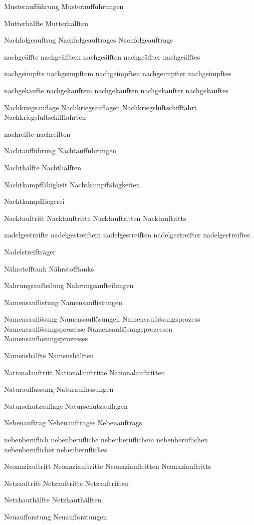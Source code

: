 Musteraufführung
Musteraufführungen

Mutterhälfte
Mutterhälften

Nachfolgeauftrag
Nachfolgeauftrages
Nachfolgeauftrags

nachgeäffte
nachgeäfftem
nachgeäfften
nachgeäffter
nachgeäfftes

nachgeimpfte
nachgeimpftem
nachgeimpften
nachgeimpfter
nachgeimpftes

nachgekaufte
nachgekauftem
nachgekauften
nachgekaufter
nachgekauftes

Nachkriegsauflage
Nachkriegsauflagen
Nachkriegsluftschifffahrt
Nachkriegsluftschifffahrten

nachreifte
nachreiften

Nachtaufführung
Nachtaufführungen

Nachthälfte
Nachthälften

Nachtkampffähigkeit
Nachtkampffähigkeiten

Nachtkampffliegerei

Nacktauftritt
Nacktauftritte
Nacktauftritten
Nacktauftritts

nadelgestreifte
nadelgestreiftem
nadelgestreiften
nadelgestreifter
nadelgestreiftes

Nadelstreifträger

Nährstofftank
Nährstofftanks

Nahrungsaufteilung
Nahrungsaufteilungen

Namensauflistung
Namensauflistungen

Namensauflösung
Namensauflösungen
Namensauflösungsprozess
Namensauflösungsprozesse
Namensauflösungsprozessen
Namensauflösungsprozesses

Namenshälfte
Namenshälften

Nationalauftritt
Nationalauftritte
Nationalauftritten

Naturauffassung
Naturauffassungen

Naturschutzauflage
Naturschutzauflagen

Nebenauftrag
Nebenauftrages
Nebenauftrags

nebenberuflich
nebenberufliche
nebenberuflichem
nebenberuflichen
nebenberuflicher
nebenberufliches

Neonaziauftritt
Neonaziauftritte
Neonaziauftritten
Neonaziauftritts

Netzauftritt
Netzauftritte
Netzauftritten

Netzhauthälfte
Netzhauthälften

Neuaufforstung
Neuaufforstungen

